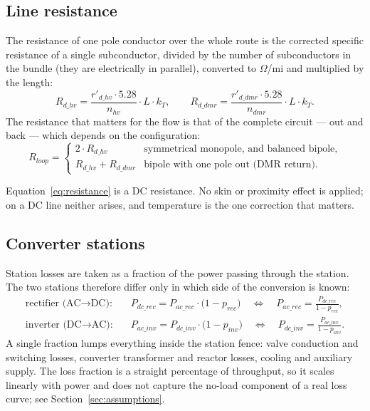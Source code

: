 \subsection{Line resistance}
The resistance of one pole conductor over the whole route is the corrected
specific resistance of a single subconductor, divided by the number of
subconductors in the bundle (they are electrically in parallel), converted to
$\Omega$/mi and multiplied by the length:
\begin{equation}
  R_{d\_hv} = \frac{r'_{d\_hv}\cdot 5.28}{n_{hv}}\cdot L\cdot k_{T},
  \qquad
  R_{d\_dmr} = \frac{r'_{d\_dmr}\cdot 5.28}{n_{dmr}}\cdot L\cdot k_{T}.
  \label{eq:resistance}
\end{equation}
The resistance that matters for the flow is that of the complete circuit ---
out and back --- which depends on the configuration:
\begin{equation}
  R_{loop} =
  \begin{cases}
    2\cdot R_{d\_hv}      & \text{symmetrical monopole, and balanced bipole,}\\[2pt]
    R_{d\_hv} + R_{d\_dmr}   & \text{bipole with one pole out (DMR return).}
  \end{cases}
  \label{eq:loop}
\end{equation}

Equation~\eqref{eq:resistance} is a DC resistance. No skin or proximity effect
is applied; on a DC line neither arises, and temperature is the one correction
that matters.

\subsection{Converter stations}
Station losses are taken as a fraction of the power passing through the
station. The two stations therefore differ only in which side of the
conversion is known:
\begin{align}
  \text{rectifier (AC}\rightarrow\text{DC):} \quad
    & P_{dc\_rec} = P_{ac\_rec}\cdot\bigl(1-p_{rec}\bigr)
      \quad\Longleftrightarrow\quad
      P_{ac\_rec} = \frac{P_{dc\_rec}}{1-p_{rec}},
      \label{eq:rect}\\[2pt]
  \text{inverter (DC}\rightarrow\text{AC):} \quad
    & P_{ac\_inv} = P_{dc\_inv}\cdot\bigl(1-p_{inv}\bigr)
      \quad\Longleftrightarrow\quad
      P_{dc\_inv} = \frac{P_{ac\_inv}}{1-p_{inv}}.
      \label{eq:inv}
\end{align}
A single fraction lumps everything inside the station fence: valve conduction
and switching losses, converter transformer and reactor losses, cooling and
auxiliary supply. The loss fraction is a straight percentage of throughput, so
it scales linearly with power and does not capture the no-load component of a
real loss curve; see Section~\ref{sec:assumptions}.

